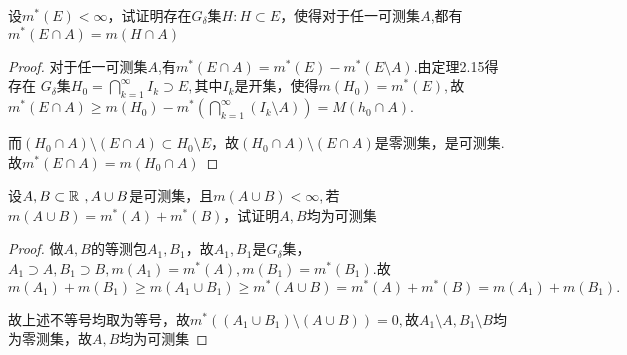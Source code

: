 设$m^*(E)<\infty$，试证明存在$G_\delta$集$H:H\subset E$，使得对于任一可测集$A$,都有$m^*(E\cap A)=m(H\cap A)$
\begin{proof}
	对于任一可测集$A$,有$m^*(E\cap A)=m^*(E)-m^*(E\setminus A).$由定理2.15得存在 $G_\delta$集$H_0=\bigcap\limits_{k=1}^{\infty} I_k\supset E,$其中$I_k$是开集，使得$m(H_0)=m^*(E),$故\\ $m^*(E\cap A)\geq m(H_0)-m^*\left(\bigcap\limits_{k=1}^{\infty}(I_k\setminus A) \right)=M(h_0\cap A) .$\par 而$(H_0\cap A)\setminus(E\cap A)\subset H_0\setminus E$，故$(H_0\cap A)\setminus(E\cap A)$是零测集，是可测集.故$m^*(E\cap A)=m(H_0\cap A)$
\end{proof}

设$A,B\subset\mathbb{R}^{\ },A\cup B$是可测集，且$m(A\cup B)<\infty,$若$m(A\cup B)=m^*(A)+m^*(B)$，试证明$A,B$均为可测集
\begin{proof}
	做$A,B$的等测包$A_1,B_1$，故$A_1,B_1$是$G_\delta$集，$A_1\supset A,B_1\supset B,m(A_1)=m^*(A),m(B_1)=m^*(B_1)$.故$$m(A_1)+m(B_1)\geq m(A_1\cup B_1)\geq m^*(A\cup B)=m^*(A)+m^*(B)=m(A_1)+m(B_1).$$\par 故上述不等号均取为等号，故$m^*\left( (A_1\cup B_1)\setminus(A\cup B)\right) =0,$故$A_1\setminus A,B_1\setminus B$均为零测集，故$A,B$均为可测集
\end{proof}